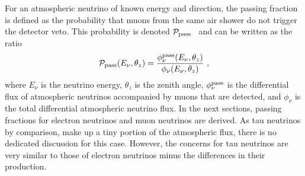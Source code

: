 For an atmospheric neutrino of known energy and direction, the passing fraction is defined as the probability that muons from the same air shower do not trigger the detector veto.
This probability is denoted ${\mathcal P}_{\rm pass}$~\cite{Schonert:2008is, Gaisser:2014bja} and can be written as the ratio
\begin{equation}
{\mathcal P}_{\rm pass} (E_\nu, \theta_z) = \frac{\phi_\nu^{\rm pass}(E_\nu, \theta_z)}{\phi_\nu(E_\nu, \theta_z)} ~,
\end{equation}
where $E_\nu$ is the neutrino energy, $\theta_z$ is the zenith angle, $\phi_\nu^{\rm pass}$ is the differential flux of atmospheric neutrinos accompanied by muons that are detected, and $\phi_\nu$ is the total differential atmospheric neutrino flux.
In the next sections, passing fractions for electron neutrinos and muon neutrinos are derived.
As tau neutrinos by comparison, make up a tiny portion of the atmospheric flux, there is no dedicated discussion for this case.
However, the concerns for tau neutrinos are very similar to those of electron neutrinos minus the differences in their production.


